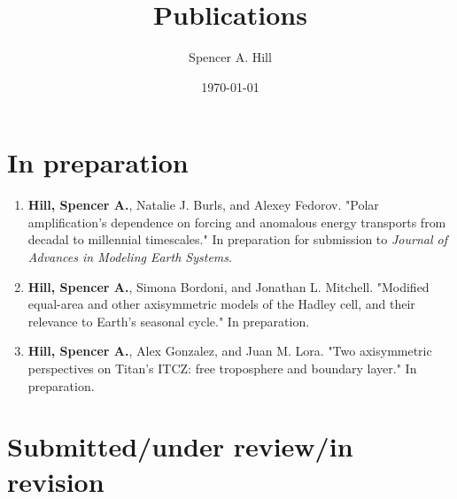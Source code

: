 \documentclass[12pt,letterpaper]{shillcv}
\author{Spencer A. Hill}
\date{\today}
\title{Publications}
\begin{document}
\maketitle
\section*{In preparation}
\label{sec:orgbf164a7}
\begin{enumerate}
\item \textbf{Hill, Spencer A.}, Natalie J. Burls, and Alexey Fedorov.  "Polar
amplification's dependence on forcing and anomalous energy transports from
decadal to millennial timescales."  In preparation for submission to \emph{Journal
of Advances in Modeling Earth Systems}.
\item \textbf{Hill, Spencer A.}, Simona Bordoni, and Jonathan L. Mitchell.  "Modified
equal-area and other axisymmetric models of the Hadley cell, and their
relevance to Earth's seasonal cycle."  In preparation.
\item \textbf{Hill, Spencer A.}, Alex Gonzalez, and Juan M. Lora.  "Two axisymmetric
perspectives on Titan's ITCZ: free troposphere and boundary layer."  In
preparation.
\end{enumerate}
\section*{Submitted/under review/in revision}
\label{sec:org185d29c}
\end{document}
